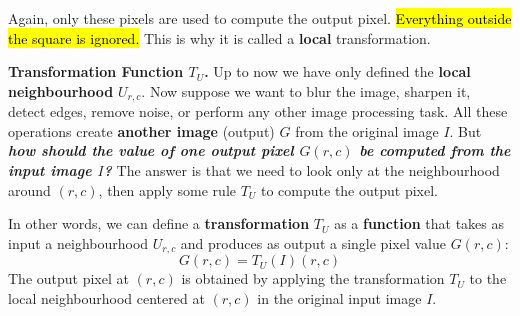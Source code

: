 \highspace
Again, only these pixels are used to compute the output pixel. \hl{Everything outside the square is ignored.} This is why it is called a \textbf{local} transformation.

\highspace
\textcolor{Green3}{ \textbf{Transformation Function $T_U$.}} Up to now we have only defined the \textbf{local neighbourhood} $U_{r,c}$. Now suppose we want to blur the image, sharpen it, detect edges, remove noise, or perform any other image processing task. All these operations create \textbf{another image} (output) $G$ from the original image $I$. But \emph{\textbf{how should the value of one output pixel $G(r, c)$ be computed from the input image $I$?}} The answer is that we need to look only at the neighbourhood around $\left(r,c\right)$, then apply some rule $T_U$ to compute the output pixel.

\highspace
In other words, we can define a \textbf{transformation} $T_U$ as a \textbf{function} that takes as input a neighbourhood $U_{r,c}$ and produces as output a single pixel value $G(r,c)$:
\begin{equation*}
    G(r,c) = T_U\left(I\right)\left(r,c\right)
\end{equation*}
The output pixel at $\left(r,c\right)$ is obtained by applying the transformation $T_U$ to the local neighbourhood centered at $\left(r,c\right)$ in the original input image $I$.

